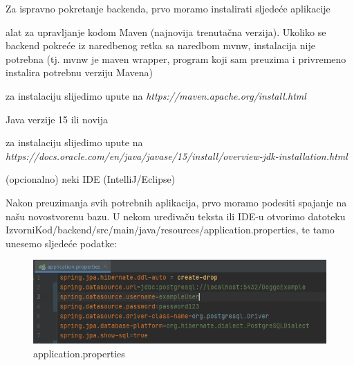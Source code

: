                 Za ispravno pokretanje backenda, prvo moramo instalirati sljedeće aplikacije
			         \begin{packed_item}
                            \item[$\bullet$] alat za upravljanje kodom Maven (najnovija trenutačna verzija). Ukoliko se backend pokreće iz naredbenog retka sa naredbom mvnw, instalacija nije potrebna (tj. mvnw je maven wrapper, program koji sam preuzima i privremeno instalira potrebnu verziju Mavena)
                            \begin{packed_item}
                                \item[$\bullet$] za instalaciju slijedimo upute na \textit{https://maven.apache.org/install.html}
                            \end{packed_item}
                            \item[$\bullet$] Java verzije 15 ili novija
                            \begin{packed_item}
                                \item[$\bullet$] za instalaciju slijedimo upute na \textit{https://docs.oracle.com/en/java/javase/15/install/overview-jdk-installation.html}
                            \end{packed_item}
                            \item[$\bullet$] (opcionalno) neki IDE (IntelliJ/Eclipse)
                    \end{packed_item}
                    
                    \noindent Nakon preuzimanja svih potrebnih aplikacija, prvo moramo podesiti spajanje na našu novostvorenu bazu. U nekom uređivaču teksta ili IDE-u otvorimo datoteku IzvorniKod/backend/src/main/java/resources/application.properties, te tamo unesemo sljedeće podatke:
                    
                    \begin{figure}[H]
        				\includegraphics[scale=0.6]{slike/deploy_applicationproperties.PNG} 
        				\centering
        				\caption{application.properties}
        				\label{fig:sustav-prvi-slucaj}
        			\end{figure}
                    
